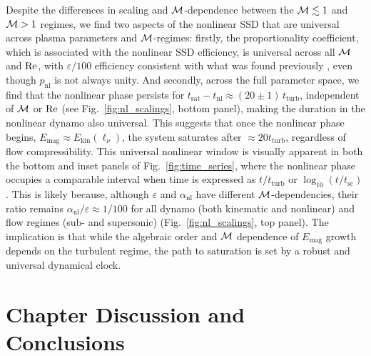     Despite the differences in scaling and $\mathcal{M}$-dependence between the $\mathcal{M} \lesssim 1$ and $\mathcal{M} > 1$ regimes, we find two aspects of the nonlinear SSD that are universal across plasma parameters and $\mathcal{M}$-regimes: firstly, the proportionality coefficient, which is associated with the nonlinear SSD efficiency, is universal across all $\mathcal{M}$ and $\mathrm{Re}$, with $\varepsilon / 100$ efficiency consistent with what was found previously \citep{beresnyak2012universal}, even though $p_\mathrm{nl}$ is not always unity. And secondly, across the full parameter space, we find that the nonlinear phase persists for $t_\mathrm{sat} - t_\mathrm{nl} \approx (20 \pm 1) \,t_\mathrm{turb}$, independent of $\mathcal{M}$ or $\mathrm{Re}$ (see Fig.~\ref{fig:nl_scalings}, bottom panel), making the duration in the nonlinear dynamo also universal. This suggests that once the nonlinear phase begins, $E_\mathrm{mag} \approx E_{\mathrm{kin}}(\ell_\nu)$, the system saturates after $\approx 20 t_\mathrm{turb}$, regardless of flow compressibility. This universal nonlinear window is visually apparent in both the bottom and inset panels of Fig.~\ref{fig:time_series}, where the nonlinear phase occupies a comparable interval when time is expressed as $t/t_\mathrm{turb}$ or $\log_{10}(t/t_\mathrm{sc})$. This is likely because, although $\varepsilon$ and $\alpha_\mathrm{nl}$ have different $\mathcal{M}$-dependencies, their ratio remains $\alpha_\mathrm{nl} / \varepsilon \approx 1/100$ for all dynamo (both kinematic and nonlinear) and flow regimes (sub- and supersonic) (Fig.~\ref{fig:nl_scalings}, top panel). The implication is that while the algebraic order and $\mathcal{M}$ dependence of $E_\mathrm{mag}$ growth depends on the turbulent regime, the path to saturation is set by a robust and universal dynamical clock.

\section{Chapter Discussion and Conclusions}

